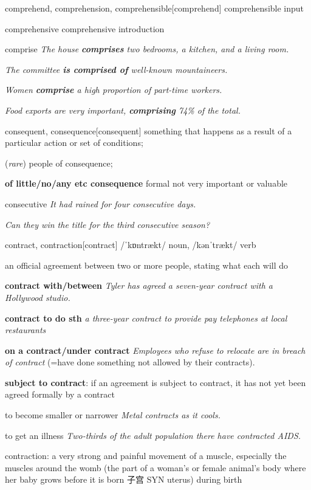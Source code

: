 \begin{word}{comprehend, comprehension, comprehensible}[comprehend]
    comprehensible input
\end{word}

\begin{word}{comprehensive}
    comprehensive introduction
\end{word}

\begin{word}{comprise}
    \textit{The house \textbf{comprises} two bedrooms, a kitchen, and a living room.} 
    
    \textit{The committee \textbf{is comprised of} well-known mountaineers. }
    
    \textit{Women \textbf{comprise} a high proportion of part-time workers.} 
    
    \textit{Food exports are very important, \textbf{comprising} 74\% of the total.}
\end{word}

\begin{word}{consequent, consequence}[consequent]
    something that happens as a result of a particular action or set of conditions; 
    
    (\textit{rare}) people of consequence; 
    
    \textbf{of little/no/any etc consequence} formal not very important or valuable
\end{word}

\begin{word}{consecutive}
   \textit{ It had rained for four consecutive days.}

    \textit{Can they win the title for the third consecutive season?}
\end{word}

\begin{word}{contract, contraction}[contract]
    /ˈkɒntrækt/ noun, /kənˈtrækt/ verb

    an official agreement between two or more people, stating what each will do

    \textbf{contract with/between}
    \textit{Tyler has agreed a seven-year contract with a Hollywood studio.}

    \textbf{contract to do sth}
    \textit{a three-year contract to provide pay telephones at local restaurants}

    \textbf{on a contract/under contract}
    \textit{Employees who refuse to relocate are in breach of contract} (=have done something not allowed by their contracts).


    \textbf{subject to contract}: if an agreement is subject to contract, it has not yet been agreed formally by a contract

    to become smaller or narrower
    \textit{Metal contracts as it cools.}

    to get an illness
    \textit{Two-thirds of the adult population there have contracted AIDS.}

    contraction: a very strong and painful movement of a muscle, especially the muscles around the womb (the part of a woman's or female animal's body where her baby grows before it is born 子宫 SYN  uterus) during birth
\end{word}

